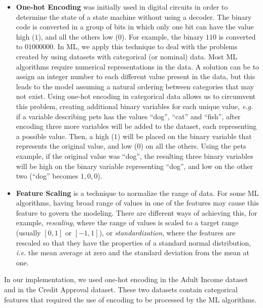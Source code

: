 \begin{itemize}
    \setlength\itemsep{1em}

	\item\textbf{One-hot Encoding}\cite{harris2010digital} was initially used in digital circuits in order to determine the state of a state machine without using a decoder. The binary code is converted in a group of bits in which only one bit can have the value high ($1$), and all the others low ($0$). For example, the binary $110$ is converted to $01000000$.
	In \ac{ML}, we apply this technique to deal with the problems created by using datasets with categorical (or nominal) data. Most \ac{ML} algorithms require numerical representations in the data. A solution can be to assign an integer number to each different value present in the data, but this leads to the model assuming a natural ordering between categories that may not exist.
	Using one-hot encoding in categorical data allows us to circumvent this problem, creating additional binary variables for each unique value, \textit{e.g.} if a variable describing pets has the values ``dog'', ``cat'' and ``fish'', after encoding three more variables will be added to the dataset, each representing a possible value. Then, a high ($1$) will be placed on the binary variable that represents the original value, and low ($0$) on all the others. Using the pets example, if the original value was ``dog'', the resulting three binary variables will be high on the binary variable representing ``dog'', and low on the other two (``dog'' becomes $1,0,0$).

	\item\textbf{Feature Scaling} is a technique to normalize the range of data. For some \ac{ML} algorithms, having broad range of values in one of the features may cause this feature to govern the modeling. There are different ways of achieving this, for example, \textit{rescaling}, where the range of values is scaled to a target range (usually $[0,1]$ or $[-1,1]$), or \textit{standardization}, where the features are rescaled so that they have the properties of a standard normal distribution, \textit{i.e.} the mean average at zero and the standard deviation from the mean at one.



\end{itemize}

In our implementation, we used one-hot encoding in the Adult Income dataset and in the Credit Approval dataset. These two datasets contain categorical features that required the use of encoding to be processed by the \ac{ML} algorithms.

